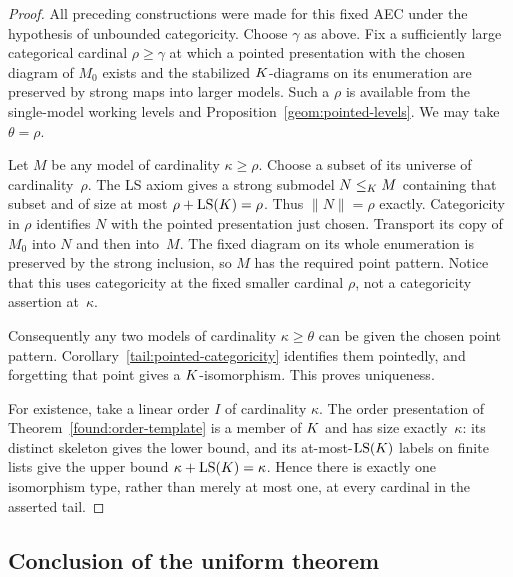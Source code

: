 \begin{proof}
All preceding constructions were made for this fixed AEC
under the hypothesis of unbounded categoricity.  Choose
$\gamma$ as above.  Fix a sufficiently large categorical
cardinal $\rho\geq\gamma$ at which a pointed presentation
with the chosen diagram of $M_0$ exists and the stabilized
$K$-diagrams on its enumeration are preserved by strong
maps into larger models.  Such a $\rho$ is available from
the single-model working levels and
Proposition~\ref{geom:pointed-levels}.  We may take
$\theta=\rho$.

Let $M$ be any model of cardinality
$\kappa\geq\rho$.  Choose a subset of its universe of
cardinality~$\rho$.  The LS axiom gives a strong submodel
$N\leq_K M$ containing that subset and of size at most
$\rho+\operatorname{LS}(K)=\rho$.  Thus $\|N\|=\rho$ exactly.
Categoricity in $\rho$ identifies $N$ with the pointed
presentation just chosen.  Transport its copy of $M_0$
into $N$ and then into~$M$.  The fixed diagram on its
whole enumeration is preserved by the strong inclusion,
so $M$ has the required point pattern.  Notice that this
uses categoricity at the fixed smaller cardinal $\rho$,
not a categoricity assertion at~$\kappa$.

Consequently any two models of cardinality
$\kappa\geq\theta$ can be given the chosen point pattern.
Corollary~\ref{tail:pointed-categoricity} identifies them
pointedly, and forgetting that point gives a
$K$-isomorphism.  This proves uniqueness.

For existence, take a linear order $I$ of cardinality
$\kappa$.  The order presentation of
Theorem~\ref{found:order-template} is a member of $K$ and
has size exactly~$\kappa$: its distinct skeleton gives
the lower bound, and its at-most-$\operatorname{LS}(K)$ labels on
finite lists give the upper bound
$\kappa+\operatorname{LS}(K)=\kappa$.  Hence there is exactly one
isomorphism type, rather than merely at most one, at every
cardinal in the asserted tail.
\end{proof}

\subsection*{Conclusion of the uniform theorem}
\label{tail:uniform-threshold}

